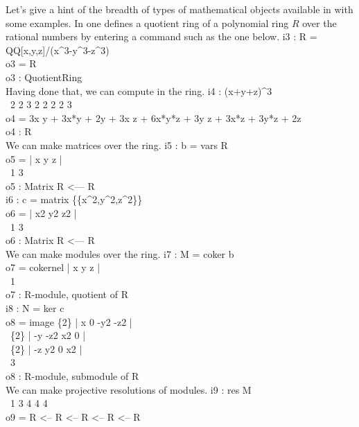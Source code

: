 Let's give a hint of the breadth of types of mathematical objects available
in \Mtwo with some examples.
In \Mtwo one defines a quotient ring of a polynomial ring $R$ over the
rational numbers by entering a command such as the one below.
\beginOutput
i3 : R = QQ[x,y,z]/(x^3-y^3-z^3)\\
\emptyLine
o3 = R\\
\emptyLine
o3 : QuotientRing\\
\endOutput
Having done that, we can compute in the ring.
\beginOutput
i4 : (x+y+z)^3\\
\emptyLine
\       2        2     3     2               2        2       2     3\\
o4 = 3x y + 3x*y  + 2y  + 3x z + 6x*y*z + 3y z + 3x*z  + 3y*z  + 2z\\
\emptyLine
o4 : R\\
\endOutput
We can make matrices over the ring.
\beginOutput
i5 : b = vars R\\
\emptyLine
o5 = | x y z |\\
\emptyLine
\             1       3\\
o5 : Matrix R  <--- R\\
\endOutput
\beginOutput
i6 : c = matrix \{\{x^2,y^2,z^2\}\}\\
\emptyLine
o6 = | x2 y2 z2 |\\
\emptyLine
\             1       3\\
o6 : Matrix R  <--- R\\
\endOutput
We can make modules over the ring.
\beginOutput
i7 : M = coker b\\
\emptyLine
o7 = cokernel | x y z |\\
\emptyLine
\                            1\\
o7 : R-module, quotient of R\\
\endOutput
\beginOutput
i8 : N = ker c\\
\emptyLine
o8 = image \{2\} | x  0   -y2 -z2 |\\
\           \{2\} | -y -z2 x2  0   |\\
\           \{2\} | -z y2  0   x2  |\\
\emptyLine
\                             3\\
o8 : R-module, submodule of R\\
\endOutput
We can make projective resolutions of modules.
\beginOutput
i9 : res M\\
\emptyLine
\      1      3      4      4      4\\
o9 = R  <-- R  <-- R  <-- R  <-- R\\
